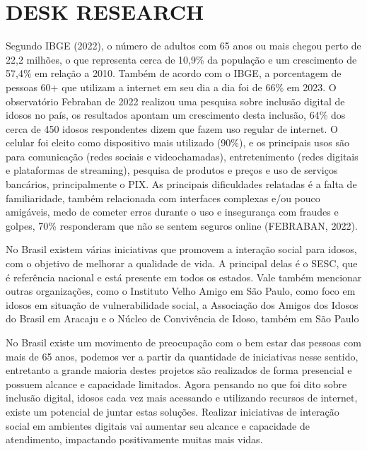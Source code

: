 \newpage
\section{DESK RESEARCH}
Segundo IBGE (2022), o número de adultos com 65 anos ou mais chegou perto de 22,2 milhões, o que representa cerca de 10,9\% da população e um crescimento de 57,4\% em relação a 2010. Também de acordo com o IBGE, a porcentagem de pessoas 60+ que utilizam a internet em seu dia a dia foi de 66\% em 2023.
O observatório Febraban de 2022 realizou uma pesquisa sobre inclusão digital de idosos no país, os resultados apontam um crescimento desta inclusão, 64\% dos cerca de 450 idosos respondentes dizem que fazem uso regular de internet. O celular foi eleito como dispositivo mais utilizado (90\%), e os principais usos são para comunicação (redes sociais e videochamadas), entretenimento (redes digitais e plataformas de streaming), pesquisa de produtos e preços e uso de serviços bancários, principalmente o PIX. As principais dificuldades relatadas é a falta de familiaridade, também relacionada com interfaces complexas e/ou pouco amigáveis, medo de cometer erros durante o uso e insegurança com fraudes e golpes, 70\% responderam que não se sentem seguros online (FEBRABAN, 2022).


No Brasil existem várias iniciativas que promovem a interação social para idosos, com o objetivo de melhorar a qualidade de vida. A principal delas é o SESC, que é referência nacional e está presente em todos os estados. Vale também mencionar outras organizações, como o Instituto Velho Amigo em São Paulo, como foco em idosos em situação de vulnerabilidade social, a Associação dos Amigos dos Idosos do Brasil em Aracaju e o Núcleo de Convivência de Idoso, também em São Paulo


 No Brasil existe um movimento de preocupação com o bem estar das pessoas com mais de 65 anos, podemos ver a partir da quantidade de iniciativas nesse sentido, entretanto a grande maioria destes  projetos são realizados de forma presencial e possuem alcance e capacidade limitados. Agora pensando no que foi dito sobre inclusão digital, idosos cada vez mais acessando e utilizando recursos de internet, existe um potencial de juntar estas soluções. Realizar iniciativas de interação social em ambientes digitais vai aumentar seu alcance e capacidade de atendimento, impactando positivamente muitas mais vidas.
